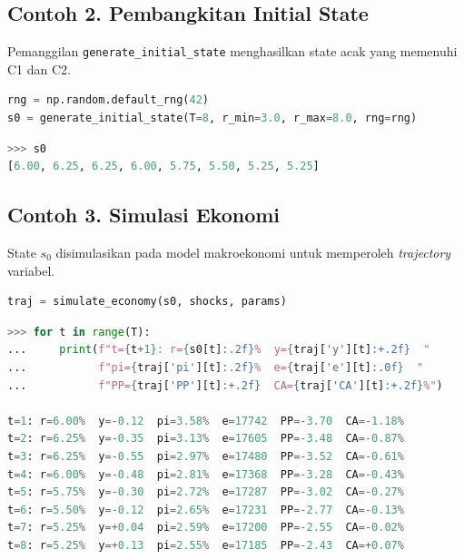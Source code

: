 \subsection*{Contoh 2. Pembangkitan Initial State}

Pemanggilan \texttt{generate\_initial\_state} menghasilkan state acak yang memenuhi C1 dan C2.

\begin{tcolorbox}[title=Input]
    \begin{lstlisting}[language=Python]
rng = np.random.default_rng(42)
s0 = generate_initial_state(T=8, r_min=3.0, r_max=8.0, rng=rng)
\end{lstlisting}
\end{tcolorbox}

\begin{tcolorbox}[title=Output]
    \begin{lstlisting}[language=Python]
>>> s0
[6.00, 6.25, 6.25, 6.00, 5.75, 5.50, 5.25, 5.25]
\end{lstlisting}
\end{tcolorbox}

\subsection*{Contoh 3. Simulasi Ekonomi}

State $s_0$ disimulasikan pada model makroekonomi untuk memperoleh \textit{trajectory} variabel.

\begin{tcolorbox}[title=Input]
    \begin{lstlisting}[language=Python]
traj = simulate_economy(s0, shocks, params)
\end{lstlisting}
\end{tcolorbox}

\begin{tcolorbox}[title=Output]
    \begin{lstlisting}[language=Python, basicstyle=\ttfamily\tiny]
>>> for t in range(T):
...     print(f"t={t+1}: r={s0[t]:.2f}%  y={traj['y'][t]:+.2f}  "
...           f"pi={traj['pi'][t]:.2f}%  e={traj['e'][t]:.0f}  "
...           f"PP={traj['PP'][t]:+.2f}  CA={traj['CA'][t]:+.2f}%")

t=1: r=6.00%  y=-0.12  pi=3.58%  e=17742  PP=-3.70  CA=-1.18%
t=2: r=6.25%  y=-0.35  pi=3.13%  e=17605  PP=-3.48  CA=-0.87%
t=3: r=6.25%  y=-0.55  pi=2.97%  e=17480  PP=-3.52  CA=-0.61%
t=4: r=6.00%  y=-0.48  pi=2.81%  e=17368  PP=-3.28  CA=-0.43%
t=5: r=5.75%  y=-0.30  pi=2.72%  e=17287  PP=-3.02  CA=-0.27%
t=6: r=5.50%  y=-0.12  pi=2.65%  e=17231  PP=-2.77  CA=-0.13%
t=7: r=5.25%  y=+0.04  pi=2.59%  e=17200  PP=-2.55  CA=-0.02%
t=8: r=5.25%  y=+0.13  pi=2.55%  e=17185  PP=-2.43  CA=+0.07%
\end{lstlisting}
\end{tcolorbox}

